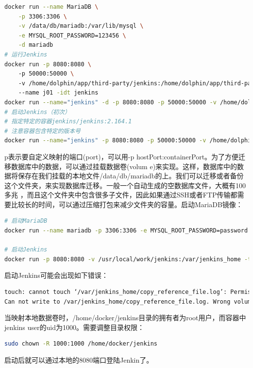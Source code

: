 \documentclass[8pt]{book}
\numberwithin{dummy}{section}
\theoremstyle{ocrenumbox}
\theoremstyle{blacknumex}
\theoremstyle{blacknumbox}
\theoremstyle{ocrenum}
\begin{document}
\begin{lstlisting}[language=Bash]
docker run --name MariaDB \
	-p 3306:3306 \
	-v /data/db/mariadb:/var/lib/mysql \
	-e MYSQL_ROOT_PASSWORD=123456 \
	-d mariadb
# 运行Jenkins
docker run -p 8080:8080 \ 
	-p 50000:50000 \ 
	-v /home/dolphin/app/third-party/jenkins:/home/dolphin/app/third-party/jenkins/jenkins_home \ 
	--name j01 -idt jenkins
docker run --name="jenkins" -d -p 8080:8080 -p 50000:50000 -v /home/dolphin/app/third-party/jenkins:/home/dolphin/app/third-party/jenkins/jenkins_home jenkins
# 启动Jenkins（初次）
# 指定特定的容器jenkins/jenkins:2.164.1
# 注意容器包含特定的版本号
docker run --name="jenkins" -p 8080:8080 -p 50000:50000 -v /home/dolphin/app/third-party/jenkins:/home/dolphin/app/third-party/jenkins/jenkins_home jenkins/jenkins:2.164.1
\end{lstlisting}

p表示要自定义映射的端口(port)，可以用-p hostPort:containerPort。为了方便迁移数据库中的数据，可以通过挂载数据卷(volum	e)来实现。这样，数据库中的数据将保存在我们挂载的本地文件/data/db/mariadb的上。我们可以迁移或者备份这个文件夹，来实现数据库迁移。一般一个自动生成的空数据库文件，大概有100多兆 ，而且这个文件夹中包含很多子文件，因此如果通过SSH或者FTP传输都需要比较长的时间，可以通过压缩打包来减少文件夹的容量。启动MariaDB镜像：

\begin{lstlisting}[language=Bash]
# 启动MariaDB
docker run --name mariadb -p 3306:3306 -e MYSQL_ROOT_PASSWORD=password -d mariadb

# 启动Jenkins
docker run -p 8080:8080 -v /usr/local/work/jenkins:/var/jenkins_home -t jenkins
\end{lstlisting}

启动Jenkins可能会出现如下错误：

\begin{lstlisting}[language=Bash]
touch: cannot touch ‘/var/jenkins_home/copy_reference_file.log’: Permission denied
Can not write to /var/jenkins_home/copy_reference_file.log. Wrong volume permissions?
\end{lstlisting}

当映射本地数据卷时，/home/docker/jenkins目录的拥有者为root用户，而容器中jenkins user的uid为1000。需要调整目录权限：

\begin{lstlisting}[language=Bash]
sudo chown -R 1000:1000 /home/docker/jenkins
\end{lstlisting}

启动后就可以通过本地的8080端口登陆Jenkin了。
\end{document}
